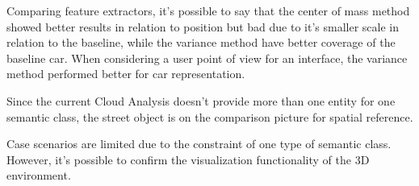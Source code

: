     Comparing feature extractors, it's possible to say that the center of mass method showed better results in relation to position but bad due to it's smaller scale in relation to the baseline, while the variance method have better coverage of the baseline car. When considering a user point of view for an interface, the variance method performed better for car representation. 
    
    Since the current Cloud Analysis doesn't provide more than one entity for one semantic class, the street object is on the comparison picture for spatial reference.
    
    Case scenarios are limited due to the constraint of one type of semantic class. However, it's possible to confirm the visualization functionality of the 3D environment.
